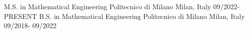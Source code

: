 


\begin{cventries}

\cventry
{M.S. in Mathematical Engineering}
{Politecnico di Milano}
{Milan, Italy}
{09/2022-PRESENT}
{}
\cventry
{B.S. in Mathematical Engineering} %
{Politecnico di Milano} %
{Milan, Italy} %
{09/2018- 09/2022} %
{}



\end{cventries}
